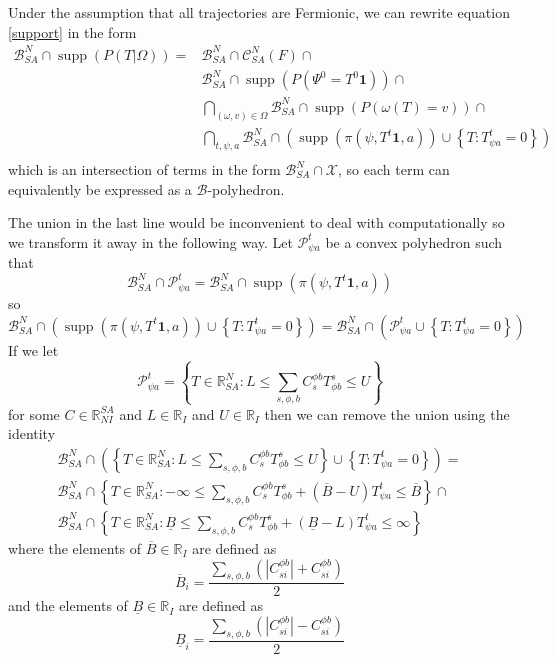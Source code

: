 \documentclass{article}
\DeclareMathOperator\supp{supp}
\begin{document}
Under the assumption that all trajectories are Fermionic, we can rewrite equation \eqref{support} in the form
\begin{equation}
\begin{aligned}
\mathcal{B}^N_{SA} \cap \supp (P( T |\Omega)) = 
& \mathcal{B}^N_{SA} \cap \mathcal{C}^N_{SA}(F) \cap \\
& \mathcal{B}^N_{SA} \cap  \supp(P(\Psi^0 = T^0\mathbf{1})) \cap\\
& \bigcap_{(\omega,v) \in \Omega}   \mathcal{B}^N_{SA} \cap \supp\left(P\left(\omega(T)=v\right)\right) \cap \\
& \bigcap_{t,\psi, a}
\mathcal{B}^N_{SA} \cap \left(\supp\left(\pi(\psi,T^t\mathbf{1},a)\right)
\cup
\left\{T: T^t_{\psi a} = 0\right\}\right)
\\
\end{aligned}
\label{fermionicSupport}
\end{equation}
which is an intersection of terms in the form $\mathcal{B}^N_{SA} \cap \mathcal{X}$, so each term can equivalently be expressed as a $\mathcal{B}$-polyhedron.

The union in the last line would be inconvenient to deal with computationally so we transform it away in the following way. Let $\mathcal{P}^t_{\psi a}$ be a convex polyhedron such that
\[
\mathcal{B}^N_{SA} \cap \mathcal{P}^t_{\psi a} = \mathcal{B}^N_{SA} \cap \supp\left(\pi(\psi,T^t\mathbf{1},a)\right)
\]
so
\[
\mathcal{B}^N_{SA} \cap \left(\supp\left(\pi(\psi,T^t\mathbf{1},a)\right) \cup
\left\{T: T^t_{\psi a} = 0\right\}\right)
=
\mathcal{B}^N_{SA} \cap \left(\mathcal{P}^t_{\psi a} \cup \left\{T: T^t_{\psi a} = 0\right\}\right)
\]
If we let
\[
\mathcal{P}^t_{\psi a} = \left\{ T\in\mathbb{R}^N_{SA} : L \le \sum_{s,\phi,b} C^{\phi b}_{s} T^s_{\phi b} \le U \right\}
\]
for some $C \in \mathbb{R}^{SA}_{NI}$ and $L\in\mathbb{R}_I$ and $U\in\mathbb{R}_I$ then we can remove the union using the identity
\begin{multline}
\mathcal{B}^N_{SA} \cap
\left(
\left\{ T\in\mathbb{R}^N_{SA} : L \le \sum_{s,\phi,b} C^{\phi b}_{s} T^s_{\phi b} \le U \right\}
\cup
\left\{T: T^t_{\psi a} = 0\right\}\right)
=\\
\mathcal{B}^N_{SA} \cap
\left\{
T\in\mathbb{R}^N_{SA}:
-\infty \le \sum_{s,\phi,b} C^{\phi b}_{s} T^s_{\phi b}
+
(\overline{B}-U)T^{t}_{\psi a}
\le \overline{B}
\right\}
\cap\\
\mathcal{B}^N_{SA} \cap
\left\{
T\in\mathbb{R}^N_{SA}:
\underline{B} \le \sum_{s,\phi,b} C^{\phi b}_{s} T^s_{\phi b}
+
(\underline{B}-L)T^{t}_{\psi a} \le \infty
\right\}
\label{implication}
\end{multline}
where the elements of $\overline{B}\in\mathbb{R}_I$ are defined as
\[
\overline{B}_i = \frac{\sum_{s,\phi,b} \left( |C^{\phi b}_{si}| + C^{\phi b}_{si}\right)}{2}
\]
and the elements of $\underline{B}\in\mathbb{R}_I$ are defined as
\[
\underline{B}_i = \frac{\sum_{s,\phi,b} \left( |C^{\phi b}_{si}| - C^{\phi b}_{si}\right)}{2}
\]
\end{document}
